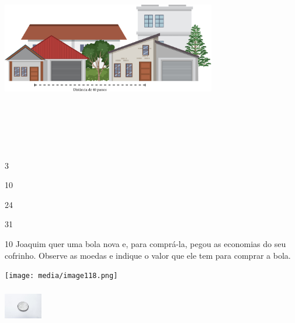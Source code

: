 \begin{escolha}
\begin{escolha}
\includegraphics[width=3.68590in,height=3.59375in]{media/image117.png}


\begin{minipage}{.5\textwidth}
\begin{escolha}
\item 3

\item 10

\item 24

\item 31
\end{escolha}
\end{minipage}

\num{10} Joaquim quer uma bola nova e, para comprá-la, pegou as economias do
seu cofrinho. Observe as moedas e indique o valor que ele tem para comprar a bola.

\texttt{[image: media/image118.png]}

\includegraphics[width=0.65539in,height=0.60039in]{media/image119.jpeg}


\end{escolha}
\end{escolha}
